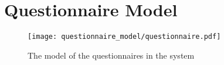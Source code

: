 
\section{Questionnaire Model}
\label{sec:questionnaire_model}

\begin{figure}[!htbp]
	\centering
	\texttt{[image: questionnaire\_model/questionnaire.pdf]}
	\caption{The model of the questionnaires in the system}
	\label{fig:questionnaire_model}
\end{figure}
